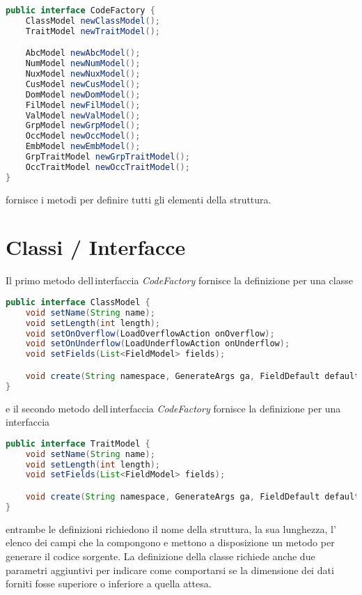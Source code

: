 \documentclass[a4paper,10pt]{report}
\begin{document}
\begin{lstlisting}[language=java, caption=interfaccia CodeFactory, 
label=code:CodeFactory]
public interface CodeFactory {
    ClassModel newClassModel();
    TraitModel newTraitModel();

    AbcModel newAbcModel();
    NumModel newNumModel();
    NuxModel newNuxModel();
    CusModel newCusModel();
    DomModel newDomModel();
    FilModel newFilModel();
    ValModel newValModel();
    GrpModel newGrpModel();
    OccModel newOccModel();
    EmbModel newEmbModel();
    GrpTraitModel newGrpTraitModel();
    OccTraitModel newOccTraitModel();
}
\end{lstlisting}
fornisce i metodi per definire tutti gli elementi della struttura.

\section{Classi / Interfacce}
Il primo metodo dell\,interfaccia \textsl{CodeFactory} fornisce la definizione 
per una classe

\begin{lstlisting}[language=java, caption=interfaccia ClassModel, 
label=code:ClassModel]
public interface ClassModel {
    void setName(String name);
    void setLength(int length);
    void setOnOverflow(LoadOverflowAction onOverflow);
    void setOnUnderflow(LoadUnderflowAction onUnderflow);
    void setFields(List<FieldModel> fields);

    void create(String namespace, GenerateArgs ga, FieldDefault defaults);
}
\end{lstlisting}

\noindent e il secondo metodo dell\,interfaccia \textsl{CodeFactory} fornisce la 
definizione per una interfaccia

\begin{lstlisting}[language=java, caption=interfaccia TraitModel, 
label=code:TraitModel]
public interface TraitModel {
    void setName(String name);
    void setLength(int length);
    void setFields(List<FieldModel> fields);

    void create(String namespace, GenerateArgs ga, FieldDefault defaults);
}
\end{lstlisting}
\noindent entrambe le definizioni richiedono il nome della struttura, la sua
lunghezza, l'\,elenco dei campi che la compongono e mettono a disposizione
un metodo per generare il codice sorgente.
La definizione della classe richiede anche due parametri aggiuntivi per indicare
come comportarsi se la dimensione dei dati forniti fosse superiore o inferiore a
quella attesa.
\end{document}

